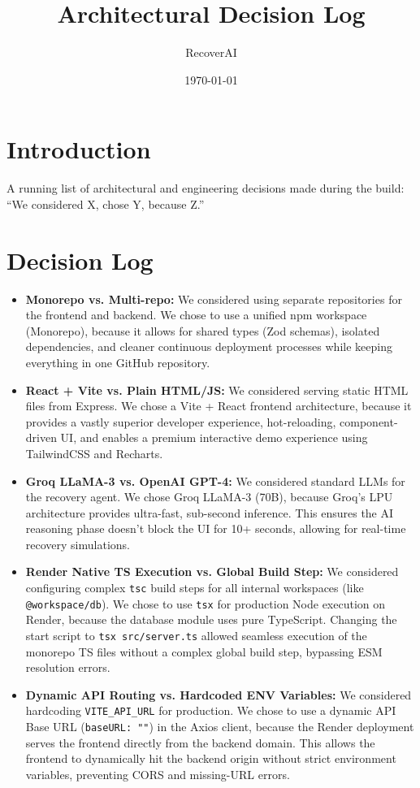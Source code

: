 \documentclass[11pt, a4paper]{article}
\title{Architectural Decision Log}
\author{RecoverAI}
\date{\today}
\begin{document}
\maketitle

\section*{Introduction}
A running list of architectural and engineering decisions made during the build: ``We considered X, chose Y, because Z.''

\section*{Decision Log}

\begin{itemize}
    \item \textbf{Monorepo vs. Multi-repo:} We considered using separate repositories for the frontend and backend. We chose to use a unified npm workspace (Monorepo), because it allows for shared types (Zod schemas), isolated dependencies, and cleaner continuous deployment processes while keeping everything in one GitHub repository.
    
    \item \textbf{React + Vite vs. Plain HTML/JS:} We considered serving static HTML files from Express. We chose a Vite + React frontend architecture, because it provides a vastly superior developer experience, hot-reloading, component-driven UI, and enables a premium interactive demo experience using TailwindCSS and Recharts.
    
    \item \textbf{Groq LLaMA-3 vs. OpenAI GPT-4:} We considered standard LLMs for the recovery agent. We chose Groq LLaMA-3 (70B), because Groq's LPU architecture provides ultra-fast, sub-second inference. This ensures the AI reasoning phase doesn't block the UI for 10+ seconds, allowing for real-time recovery simulations.
    
    \item \textbf{Render Native TS Execution vs. Global Build Step:} We considered configuring complex \texttt{tsc} build steps for all internal workspaces (like \texttt{@workspace/db}). We chose to use \texttt{tsx} for production Node execution on Render, because the database module uses pure TypeScript. Changing the start script to \texttt{tsx src/server.ts} allowed seamless execution of the monorepo TS files without a complex global build step, bypassing ESM resolution errors.
    
    \item \textbf{Dynamic API Routing vs. Hardcoded ENV Variables:} We considered hardcoding \texttt{VITE\_API\_URL} for production. We chose to use a dynamic API Base URL (\texttt{baseURL: ""}) in the Axios client, because the Render deployment serves the frontend directly from the backend domain. This allows the frontend to dynamically hit the backend origin without strict environment variables, preventing CORS and missing-URL errors.
\end{itemize}
\end{document}
